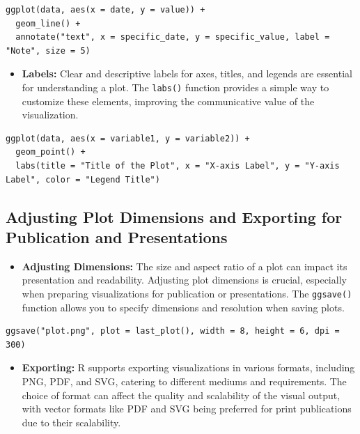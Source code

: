 \documentclass[
]{book}
\providecommand{\tightlist}{%
  \setlength{\itemsep}{0pt}\setlength{\parskip}{0pt}}
\begin{document}
\begin{verbatim}
ggplot(data, aes(x = date, y = value)) + 
  geom_line() +
  annotate("text", x = specific_date, y = specific_value, label = "Note", size = 5)
\end{verbatim}

\begin{itemize}
\tightlist
\item
  \textbf{Labels:} Clear and descriptive labels for axes, titles, and legends are essential for understanding a plot. The \texttt{labs()} function provides a simple way to customize these elements, improving the communicative value of the visualization.
\end{itemize}

\begin{verbatim}
ggplot(data, aes(x = variable1, y = variable2)) + 
  geom_point() +
  labs(title = "Title of the Plot", x = "X-axis Label", y = "Y-axis Label", color = "Legend Title")
\end{verbatim}

\subsection{Adjusting Plot Dimensions and Exporting for Publication and Presentations}\label{adjusting-plot-dimensions-and-exporting-for-publication-and-presentations}

\begin{itemize}
\tightlist
\item
  \textbf{Adjusting Dimensions:} The size and aspect ratio of a plot can impact its presentation and readability. Adjusting plot dimensions is crucial, especially when preparing visualizations for publication or presentations. The \texttt{ggsave()} function allows you to specify dimensions and resolution when saving plots.
\end{itemize}

\begin{verbatim}
ggsave("plot.png", plot = last_plot(), width = 8, height = 6, dpi = 300)
\end{verbatim}

\begin{itemize}
\tightlist
\item
  \textbf{Exporting:} R supports exporting visualizations in various formats, including PNG, PDF, and SVG, catering to different mediums and requirements. The choice of format can affect the quality and scalability of the visual output, with vector formats like PDF and SVG being preferred for print publications due to their scalability.
\end{itemize}
\end{document}
